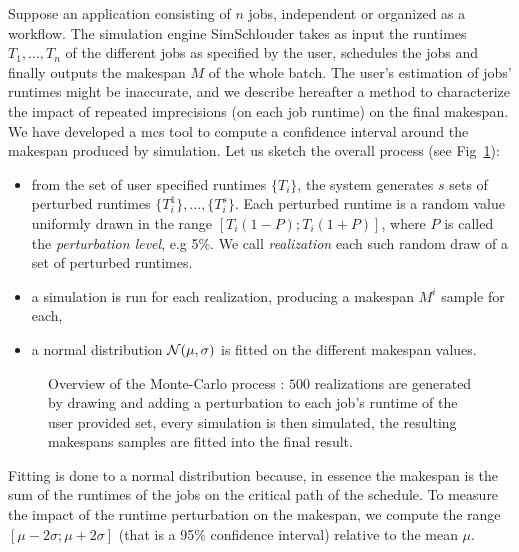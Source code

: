 \documentclass[10pt,conference,compsocconf]{IEEEtran}
\begin{document}
Suppose an  application consisting of  $n$ jobs,  independent or organized  as a
workflow.   The  simulation engine  SimSchlouder  takes  as input  the  runtimes
$T_1, \ldots ,  T_n$ of the different  jobs as specified by  the user, schedules
the jobs and  finally outputs the makespan  $M$ of the whole  batch.  The user's
estimation of  jobs' runtimes might be  inaccurate, and we describe  hereafter a
method to characterize the impact of repeated imprecisions (on each job runtime)
on the  final makespan.  We  have developed a \ac{mcs}  tool to compute a
confidence interval around the makespan produced   by   simulation.   Let   us
sketch   the   overall   process   (see Fig~\ref{fig:mc-process}):
\begin{itemize} 
\item from  the set of user  specified runtimes $\{T_i\}$, the  system generates
  $s$ sets of perturbed runtimes  $\{T_i^1\}, \ldots, \{T_i^s\}$. Each perturbed
  runtime    is   a    random   value    uniformly   drawn    in   the    range
  $[T_i (1-P); T_i  (1+P)]$, where $P$ is called  the \emph{perturbation level},
  e.g  5\%.  We call \emph{realization}  each  such random  draw  of  a set  of
  perturbed runtimes.
\item a simulation  is run for each realization, producing a makespan $M^i$
	sample for each,
\item  a  normal  distribution  ${\cal N}(\mu,\sigma)$  is  fitted  on
	the different  makespan values.
\end{itemize}
\begin{figure}
	\centering
	\resizebox{0.5\textwidth}{!}{%
		
		}
                \caption{Overview   of   the   Monte-Carlo   process   :   $500$
                  realizations   are  generated   by   drawing   and  adding   a
                  perturbation to each  job's runtime of the  user provided set,
                  every simulation  is then  simulated, the  resulting makespans
		  samples are fitted into the final result. \label{fig:mcprocess}
		  }
      \label{fig:mc-process}
\end{figure}
Fitting is done to a normal distribution because, in essence the makespan is the
sum  of the  runtimes of  the jobs  on the  critical path  of the  schedule.  To
measure the impact  of the runtime perturbation on the  makespan, we compute the
range $[\mu-2\sigma;\mu+2\sigma]$ (that is  a 95\% confidence interval) relative
to  the mean  $\mu$. 
\end{document}

